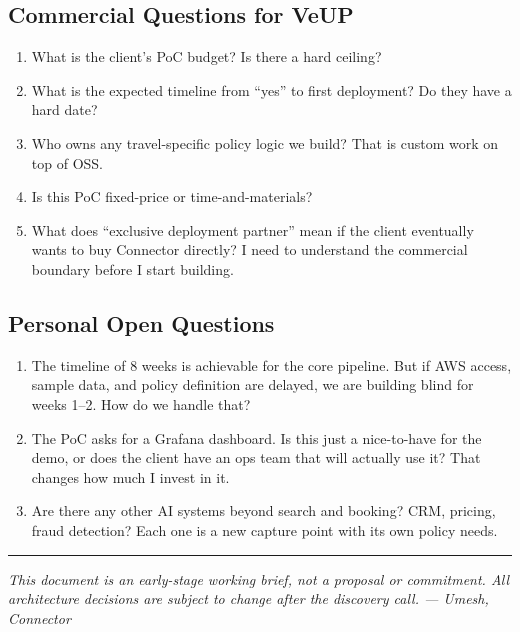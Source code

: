 \documentclass[11pt, a4paper]{article}
\begin{document}
\vspace{1em}
\subsection{Commercial Questions for VeUP}

\begin{enumerate}[leftmargin=*, label=\textbf{C\arabic*.}]
  \item What is the client's PoC budget? Is there a hard ceiling?

  \item What is the expected timeline from ``yes'' to first deployment? Do they have a hard date?

  \item Who owns any travel-specific policy logic we build? That is custom work on top of OSS.

  \item Is this PoC fixed-price or time-and-materials?

  \item What does ``exclusive deployment partner'' mean if the client eventually wants to buy Connector directly? I need to understand the commercial boundary before I start building.
\end{enumerate}

\vspace{1em}
\subsection{Personal Open Questions}

\begin{enumerate}[leftmargin=*, label=\textbf{P\arabic*.}]
  \item The timeline of 8 weeks is achievable for the core pipeline. But if AWS access, sample data, and policy definition are delayed, we are building blind for weeks 1--2. How do we handle that?

  \item The PoC asks for a Grafana dashboard. Is this just a nice-to-have for the demo, or does the client have an ops team that will actually use it? That changes how much I invest in it.

  \item Are there any other AI systems beyond search and booking? CRM, pricing, fraud detection? Each one is a new capture point with its own policy needs.
\end{enumerate}

\vspace{2em}
\hrule
\vspace{0.5em}
{\small \color{darkgray}
\textit{This document is an early-stage working brief, not a proposal or commitment. All architecture decisions are subject to change after the discovery call. --- Umesh, Connector}
}
\end{document}
